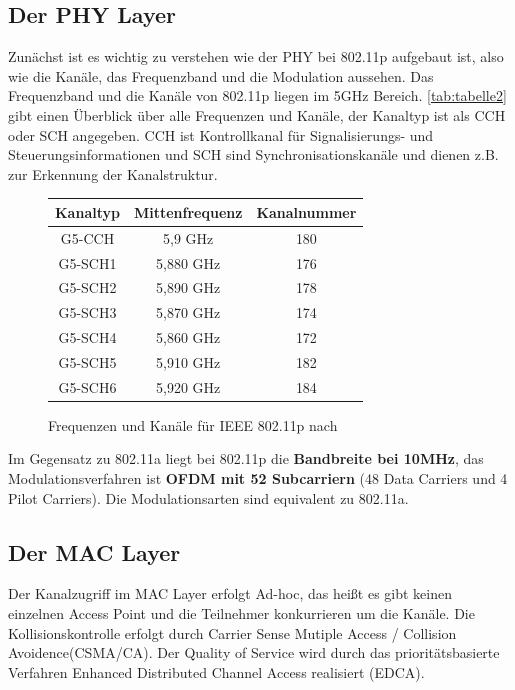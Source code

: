 \documentclass[letterpaper,11pt,ngerman]{article}
\begin{document}
\begin{onehalfspace}
\subsection{Der PHY Layer}
Zunächst ist es wichtig zu verstehen wie der PHY bei 802.11p aufgebaut ist, also wie die Kanäle, das Frequenzband und die Modulation aussehen.
Das Frequenzband und die Kanäle von 802.11p liegen im 5GHz Bereich. \autoref{tab:tabelle2} gibt einen Überblick über alle Frequenzen und Kanäle, der Kanaltyp ist als CCH oder SCH angegeben. CCH ist Kontrollkanal für Signalisierungs- und Steuerungsinformationen und SCH sind Synchronisationskanäle und dienen z.B. zur Erkennung der Kanalstruktur.
\begin{figure}[H]
\begin{center}
\begin{tabular}{|c|c|c|}\hline
\small
  \textbf{Kanaltyp} & \textbf{Mittenfrequenz}  & \textbf{Kanalnummer} \\ \hline
  G5-CCH & 5,9 GHz & 180 \\\hline
  G5-SCH1 & 5,880 GHz & 176 \\\hline
  G5-SCH2 & 5,890 GHz & 178 \\\hline
  G5-SCH3 & 5,870 GHz & 174 \\\hline
  G5-SCH4 & 5,860 GHz & 172 \\\hline
  G5-SCH5 & 5,910 GHz & 182 \\\hline
  G5-SCH6 & 5,920 GHz & 184 \\\hline
 \end{tabular}
 \caption{Frequenzen und Kanäle für IEEE 802.11p nach  \cite{etsi}}
  \label{tab:tabelle2}
  \end{center}
 \end{figure}
\noindent Im Gegensatz zu 802.11a liegt bei 802.11p die \textbf{Bandbreite bei 10MHz}, das Modulationsverfahren ist \textbf{OFDM mit 52 Subcarriern} (48 Data Carriers und 4 Pilot Carriers). Die Modulationsarten sind equivalent zu 802.11a.
\cite{etsi}
\subsection{Der MAC Layer}
Der Kanalzugriff im MAC Layer erfolgt Ad-hoc, das heißt es gibt keinen einzelnen Access Point und die Teilnehmer konkurrieren um die Kanäle. Die Kollisionskontrolle erfolgt durch Carrier Sense Mutiple Access / Collision Avoidence(CSMA/CA). Der Quality of Service wird durch das prioritätsbasierte Verfahren Enhanced Distributed Channel Access realisiert (EDCA).


\end{onehalfspace}
\end{document}
